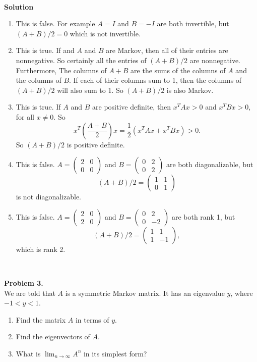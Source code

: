 \documentclass[11pt]{article}
\begin{document}
\

\noindent \textbf{Solution}\\
\begin{enumerate}
\item This is false. For example $A=I$ and $B=-I$ are both invertible, but $(A+B)/2 = 0$ which is not invertible.
\item This is true. If and $A$ and $B$ are Markov, then all of their entries are nonnegative. So certainly all the entries of $(A+B)/2$ are nonnegative. Furthermore, The columns of $A+B$ are the sums of the columns of $A$ and the columns of $B$. If each of their columns sum to 1, then the columns of $(A+B)/2$ will also sum to 1. So $(A+B)/2$ is also Markov.
\item This is true. If $A$ and $B$ are positive definite, then $x^TAx > 0$ and $x^T B x >0$, for all $x\neq 0 $. So 
$$x^T\left(\frac{A+B}{2}\right)x = \frac{1}{2} (x^TAx + x^TBx) >0.$$
So $(A+B)/2$ is positive definite.
\item This is false. $A = \begin{pmatrix} 2 & 0 \\ 0 & 0 \end{pmatrix}$ and $B = \begin{pmatrix} 0 & 2 \\ 0 & 2 \end{pmatrix}$ are both diagonalizable, but 
$$(A+B)/2 = \begin{pmatrix} 1 & 1 \\ 0 & 1 \end{pmatrix}$$
is not diagonalizable.
\item This is false. $A = \begin{pmatrix} 2 & 0 \\ 2 & 0 \end{pmatrix}$ and $B = \begin{pmatrix} 0 & 2 \\ 0 & -2 \end{pmatrix}$ are both rank 1, but 
$$(A+B)/2 = \begin{pmatrix} 1 & 1 \\ 1 & -1 \end{pmatrix},$$
which is rank 2. 
\end{enumerate}

\

\noindent \textbf{Problem 3.}\\
We are told that $A$ is a symmetric Markov matrix. It has an eigenvalue $y$, where $-1<y<1$. 
\begin{enumerate}
\item Find the matrix $A$ in terms of $y$. 
\item Find the eigenvectors of $A$.
\item What is $\lim_{n\to\infty} A^n$ in its simplest form?
\end{enumerate}
\end{document}
